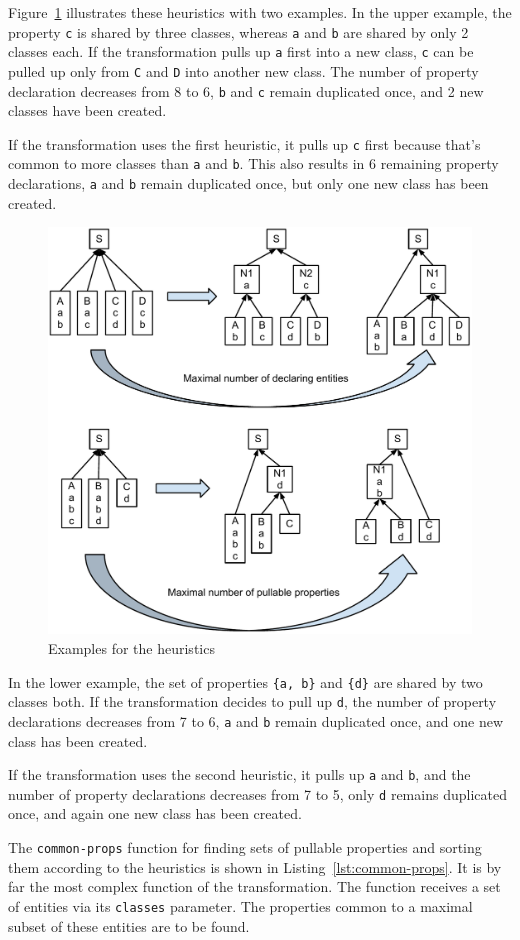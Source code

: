 \documentclass[11pt]{article}
\begin{document}
Figure~\ref{fig:heuristics-example} illustrates these heuristics with two
examples.  In the upper example, the property \verb|c| is shared by three
classes, whereas \verb|a| and \verb|b| are shared by only 2 classes each.  If
the transformation pulls up \verb|a| first into a new class, \verb|c| can be
pulled up only from \verb|C| and \verb|D| into another new class.  The number
of property declaration decreases from 8 to 6, \verb|b| and \verb|c| remain
duplicated once, and 2 new classes have been created.

If the transformation uses the first heuristic, it pulls up \verb|c| first
because that's common to more classes than \verb|a| and \verb|b|.  This also
results in 6 remaining property declarations, \verb|a| and \verb|b| remain
duplicated once, but only one new class has been created.

\begin{figure}[t]
  \centering
  \includegraphics[width=0.6\linewidth]{heuristics-example}
  \caption{Examples for the heuristics}
  \label{fig:heuristics-example}
\end{figure}

In the lower example, the set of properties \verb|{a, b}| and \verb|{d}| are
shared by two classes both.  If the transformation decides to pull up \verb|d|,
the number of property declarations decreases from 7 to 6, \verb|a| and
\verb|b| remain duplicated once, and one new class has been created.

If the transformation uses the second heuristic, it pulls up \verb|a| and
\verb|b|, and the number of property declarations decreases from 7 to 5, only
\verb|d| remains duplicated once, and again one new class has been created.

The \verb|common-props| function for finding sets of pullable properties and
sorting them according to the heuristics is shown in
Listing~\ref{lst:common-props}.  It is by far the most complex function of the
transformation.  The function receives a set of entities via its \verb|classes|
parameter.  The properties common to a maximal subset of these entities are to
be found.
\end{document}
